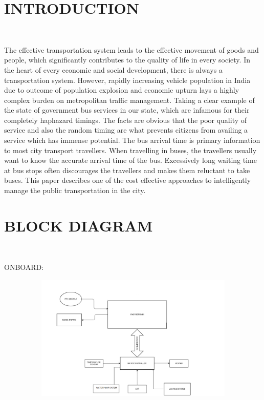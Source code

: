 \documentclass[12pt,a4paper,oneside]{report}
\begin{document}
\maketitle
\thispagestyle{empty}




\begin{onehalfspacing}






\section{INTRODUCTION}



{$\;\;\;\;$}
  
  The effective transportation system leads to the effective movement of goods and people, which significantly contributes to the quality of life in every society. In the heart of every economic and social development, there is always a transportation system. However, rapidly increasing vehicle population in India due to outcome of population explosion and economic upturn lays a highly complex burden on metropolitan traffic management.
   Taking a clear example of the state of government bus services in our state, which are infamous for their completely haphazard timings. The facts are obvious that the poor quality of service and also the random timing are what prevents citizens from availing a service which has immense potential.
  The bus arrival time is primary information to most city transport travellers. When travelling in buses, the travellers usually want to know the accurate arrival time of the bus. Excessively long waiting time at bus stops often discourages the travellers and makes them reluctant to take buses.
  This paper describes  one of the cost effective approaches to intelligently manage the public transportation in the city.


\newpage
\section{BLOCK DIAGRAM}
{$\;\;\;\;$}

ONBOARD:


\begin{figure}[h]
\includegraphics[width=15cm, height=6cm]{fig1.png}
\centering
\label{fig1}
\end{figure}


\end{onehalfspacing}
\end{document}
